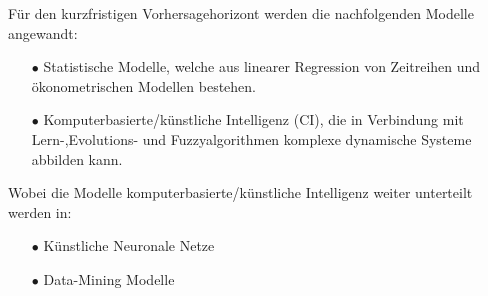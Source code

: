 Für den kurzfristigen Vorhersagehorizont werden die nachfolgenden Modelle angewandt:
\begin{itemize}
\item[\textbf{$\bullet$}]%
Statistische Modelle, welche aus linearer Regression von Zeitreihen und ökonometrischen Modellen bestehen.

\item[\textbf{$\bullet$}]%
Komputerbasierte/künstliche Intelligenz (CI), die in Verbindung mit Lern-,Evolutions- und Fuzzyalgorithmen komplexe dynamische Systeme abbilden kann.
\end{itemize}

Wobei die Modelle komputerbasierte/künstliche Intelligenz weiter unterteilt werden in: 
\begin{itemize}
\item[\textbf{$\bullet$}]%
Künstliche Neuronale Netze

\item[\textbf{$\bullet$}]%
Data-Mining Modelle
\end{itemize}


